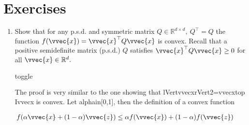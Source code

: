 \documentclass[letterpaper,10pt,english]{jupyterBook}
\begin{document}
\sphinxstepscope


\section{Exercises}
\label{\detokenize{classification_exercises:exercises}}\label{\detokenize{classification_exercises:class-exercises}}\label{\detokenize{classification_exercises::doc}}\begin{enumerate}
%
\item {} 
\sphinxAtStartPar
Show that for any p.s.d. and symmetric matrix \(Q\in\mathbb{R}^{d\times d},\ Q^\top=Q\) the function \(f(\vvec{x})=\vvec{x}^\top Q\vvec{x}\) is convex. Recall that a positive semidefinite matrix (p.s.d.) \(Q\) satisfies \(\vvec{x}^\top Q\vvec{x}\geq 0\) for all \(\vvec{x}\in\mathbb{R}^d.\)

\begin{sphinxuseclass}{toggle}
\begin{sphinxVerbatim}[commandchars=\\\{\}]
The proof is very similar to the one showing that \PYGZdl{}\PYGZbs{}lVert\PYGZbs{}vvec\PYGZob{}x\PYGZcb{}\PYGZbs{}rVert\PYGZca{}2=\PYGZbs{}vvec\PYGZob{}x\PYGZcb{}\PYGZca{}\PYGZbs{}top I\PYGZbs{}vvec\PYGZob{}x\PYGZcb{}\PYGZdl{} is convex. Let \PYGZdl{}\PYGZbs{}alpha\PYGZbs{}in[0,1]\PYGZdl{}, then the definition of a convex function
\end{sphinxVerbatim}

\end{sphinxuseclass}
\end{enumerate}
\begin{equation*}
\begin{split}f(\alpha\vvec{x}+(1-\alpha)\vvec{z})\leq \alpha f(\vvec{x})+(1-\alpha)f(\vvec{z})\end{split}
\end{equation*}
\end{document}

